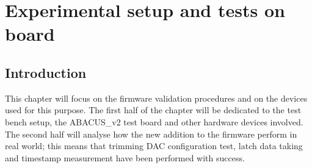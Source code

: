 \chapter{Experimental setup and tests on board}
\section{Introduction}
This chapter will focus on the firmware validation procedures and on the devices used for this purpose. The first half of the chapter will be dedicated to the test bench setup, the ABACUS\_v2 test board and other hardware devices involved. The second half will analyse how the new addition to the firmware perform in real world; this means that trimming DAC configuration test, latch data taking and timestamp measurement have been performed with success.

